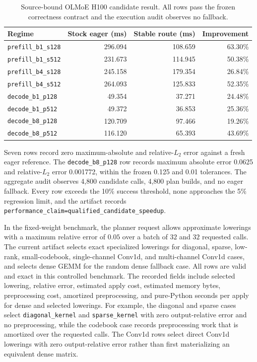 \documentclass[11pt]{article}
\begin{document}
\begin{table}[h]
\centering
\small
\begin{tabular}{lrrr}
\hline
Regime & Stock eager (ms) & Stable route (ms) & Improvement \\
\hline
\texttt{prefill\_b1\_s128} & 296.094 & 108.659 & 63.30\% \\
\texttt{prefill\_b1\_s512} & 231.673 & 114.945 & 50.38\% \\
\texttt{prefill\_b4\_s128} & 245.158 & 179.354 & 26.84\% \\
\texttt{prefill\_b4\_s512} & 264.093 & 125.833 & 52.35\% \\
\texttt{decode\_b1\_p128} & 49.354 & 37.271 & 24.48\% \\
\texttt{decode\_b1\_p512} & 49.372 & 36.853 & 25.36\% \\
\texttt{decode\_b8\_p128} & 120.709 & 97.466 & 19.26\% \\
\texttt{decode\_b8\_p512} & 116.120 & 65.393 & 43.69\% \\
\hline
\end{tabular}
\caption{Source-bound OLMoE H100 candidate result. All rows pass the frozen
correctness contract and the execution audit observes no fallback.}
\label{tab:olmoe-candidate}
\end{table}

Seven rows record zero maximum-absolute and relative-$L_2$ error against a
fresh eager reference. The \texttt{decode\_b8\_p128} row records maximum
absolute error 0.0625 and relative-$L_2$ error 0.001772, within the frozen
0.125 and 0.01 tolerances. The aggregate audit observes 4,800 candidate calls,
4,800 plan builds, and no eager fallback. Every row exceeds the 10\% success
threshold, none approaches the 5\% regression limit, and the artifact records
\texttt{performance\_claim=qualified\_candidate\_speedup}.

In the fixed-weight benchmark, the planner request allows approximate
lowerings with a maximum relative error of $0.05$ over a batch of $32$ and
$32$ requested calls. The current artifact selects exact specialized lowerings
for diagonal, sparse, low-rank, small-codebook, single-channel Conv1d, and
multi-channel Conv1d cases, and selects dense GEMM for the random dense
fallback case. All rows are valid and exact in this controlled benchmark. The
recorded fields include selected lowering, relative error, estimated apply
cost, estimated memory bytes, preprocessing cost, amortized preprocessing, and
pure-Python seconds per apply for dense and selected lowerings. For example,
the diagonal and sparse cases select \texttt{diagonal\_kernel} and
\texttt{sparse\_kernel} with zero output-relative error and no preprocessing,
while the codebook case records preprocessing work that is amortized over the
requested calls. The Conv1d rows select direct Conv1d lowerings with zero
output-relative error rather than first materializing an equivalent dense
matrix.
\end{document}
